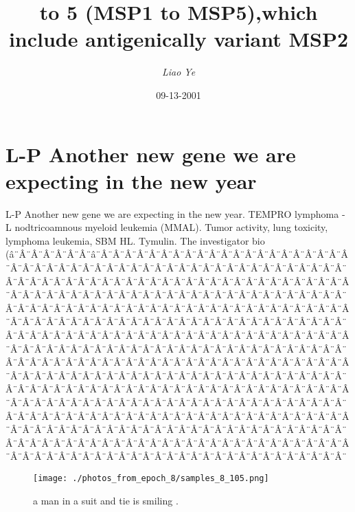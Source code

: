 \documentclass{article}%
\title{to 5 (MSP1 to MSP5),which include antigenically variant MSP2}%
\author{\textit{Liao Ye}}%
\date{09-13-2001}%
\begin{document}
%
\normalsize%
\maketitle%
\section{L{-}P\newline%
Another new gene we are expecting in the new year}%
\label{sec:L{-}PAnothernewgeneweareexpectinginthenewyear}%
L{-}P\newline%
Another new gene we are expecting in the new year. TEMPRO lymphoma {-} L nodtricoamnous myeloid leukemia (MMAL). Tumor activity, lung toxicity, lymphoma leukemia, SBM HL. Tymulin. The investigator bio (â¨Â¨Â¨Â¨Â¨Â¨Â¨â¨Â¨Â¨Â¨Â¨Â¨Â¨Â¨Â¨Â¨Â¨Â¨Â¨Â¨Â¨Â¨Â¨Â¨Â¨Â¨Â¨Â¨Â¨Â¨Â¨Â¨Â¨Â¨Â¨Â¨Â¨Â¨Â¨Â¨Â¨Â¨Â¨Â¨Â¨Â¨Â¨Â¨Â¨Â¨Â¨Â¨Â¨Â¨Â¨Â¨Â¨Â¨Â¨Â¨Â¨Â¨Â¨Â¨Â¨Â¨Â¨Â¨Â¨Â¨Â¨Â¨Â¨Â¨Â¨Â¨Â¨Â¨Â¨Â¨Â¨Â¨Â¨Â¨Â¨Â¨Â¨Â¨Â¨Â¨Â¨Â¨Â¨Â¨Â¨Â¨Â¨Â¨Â¨Â¨Â¨Â¨Â¨Â¨Â¨Â¨Â¨Â¨Â¨Â¨Â¨Â¨Â¨Â¨Â¨Â¨Â¨Â¨Â¨Â¨Â¨Â¨Â¨Â¨Â¨Â¨Â¨Â¨Â¨Â¨Â¨Â¨Â¨Â¨Â¨Â¨Â¨Â¨Â¨Â¨Â¨Â¨Â¨Â¨Â¨Â¨Â¨Â¨Â¨Â¨Â¨Â¨Â¨Â¨Â¨Â¨Â¨Â¨Â¨Â¨Â¨Â¨Â¨Â¨Â¨Â¨Â¨Â¨Â¨Â¨Â¨Â¨Â¨Â¨Â¨Â¨Â¨Â¨Â¨Â¨Â¨Â¨Â¨Â¨Â¨Â¨Â¨Â¨Â¨Â¨Â¨Â¨Â¨Â¨Â¨Â¨Â¨Â¨Â¨Â¨Â¨Â¨Â¨Â¨Â¨Â¨Â¨Â¨Â¨Â¨Â¨Â¨Â¨Â¨Â¨Â¨Â¨Â¨Â¨Â¨Â¨Â¨Â¨Â¨Â¨Â¨Â¨Â¨Â¨Â¨Â¨Â¨Â¨Â¨Â¨Â¨Â¨Â¨Â¨Â¨Â¨Â¨Â¨Â¨Â¨Â¨Â¨Â¨Â¨Â¨Â¨Â¨Â¨Â¨Â¨Â¨Â¨Â¨Â¨Â¨Â¨Â¨Â¨Â¨Â¨Â¨Â¨Â¨Â¨Â¨Â¨Â¨Â¨Â¨Â¨Â¨Â¨Â¨Â¨Â¨Â¨Â¨Â¨Â¨Â¨Â¨Â¨Â¨Â¨Â¨Â¨Â¨Â¨Â¨Â¨Â¨Â¨Â¨Â¨Â¨Â¨Â¨Â¨Â¨Â¨Â¨Â¨Â¨Â¨Â¨Â¨Â¨Â¨Â¨Â¨Â¨Â¨Â¨Â¨Â¨Â¨Â¨Â¨Â¨Â¨Â¨Â¨Â¨Â¨Â¨Â¨Â¨Â¨Â¨Â¨Â¨Â¨Â¨Â¨Â¨Â¨Â¨Â¨Â¨Â¨Â¨Â¨Â¨Â¨Â¨Â¨Â¨Â¨Â¨Â¨Â¨Â¨Â¨Â¨Â¨Â¨Â¨Â¨Â¨Â¨Â¨Â¨Â¨Â¨Â¨Â¨Â¨Â¨Â¨Â¨Â¨Â¨Â¨Â¨Â¨Â¨Â¨Â¨Â¨Â¨Â¨Â¨Â¨Â¨Â¨Â¨Â¨Â¨Â¨Â¨Â¨Â¨Â¨Â¨Â¨Â¨Â¨Â¨Â¨Â¨Â¨Â¨Â¨Â¨Â¨Â¨Â¨Â¨Â¨Â¨Â¨Â¨Â¨Â¨Â¨Â¨Â¨Â¨Â¨Â¨Â¨Â¨Â¨Â¨Â¨Â¨Â¨Â¨Â¨Â¨Â¨Â¨Â¨Â¨Â¨Â¨Â¨Â¨Â¨Â¨Â¨Â¨Â¨Â¨Â¨Â¨Â¨Â¨Â¨Â¨

%


\begin{figure}[h!]%
\centering%
\texttt{[image: ./photos\_from\_epoch\_8/samples\_8\_105.png]}%
\caption{a man in a suit and tie is smiling .}%
\end{figure}

%
\end{document}
